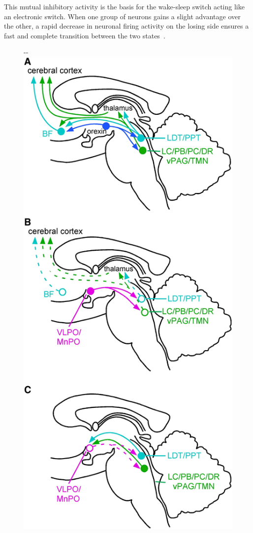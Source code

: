            This mutual inhibitory activity is the basis for the wake-sleep switch acting like an electronic switch.
            When one group of neurons gains a slight advantage over the other, a rapid decrease in neuronal firing activity on the losing side ensures a fast and complete transition between the two states~\cite{Saper2010, Schneider2017}.
            
            \begin{figure}
                \begin{adjustwidth*}{}{-\marginparwidth-\marginparsep}
                \centering
                \includegraphics[height=0.775\textheight]{figures/clinical-background/SleepStateSwitching/Figure1.png}

\end{adjustwidth*}
\end{figure}
